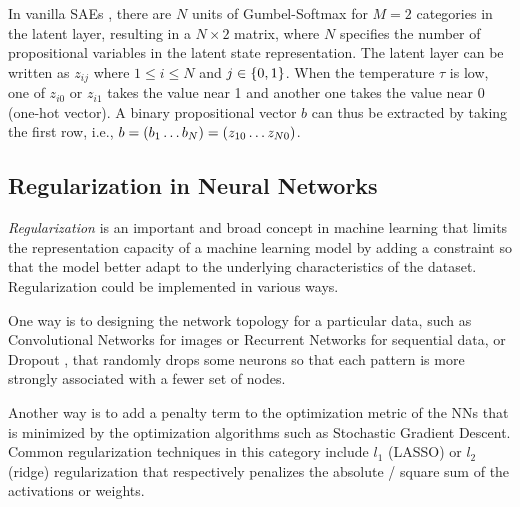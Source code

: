 In vanilla SAEs \cite{Asai2018}, there are $N$ units of Gumbel-Softmax
for $M=2$ categories in the latent layer, resulting in a $N\times 2$ matrix,
where $N$ specifies the number of propositional variables in the latent
state representation. The latent layer can be written as
$z_{ij}$ where $1\leq i \leq N$ and $j\in {\left\{0,1\right\}}$.  When the
temperature $\tau$ is low, one of $z_{i0}$ or $z_{i1}$ takes the value
near 1 and another one takes the value near 0 (one-hot vector).  A binary
propositional vector $b$ can thus be extracted by taking the first row, i.e.,
$b={\left(b_1\ldots b_N\right)}={\left(z_{10}\ldots z_{N0}\right)}$.

\subsection{Regularization in Neural Networks}

\emph{Regularization} is an important and broad concept in machine learning
that limits the representation capacity of a machine learning model by adding a constraint
so that the model better adapt to the underlying characteristics of the dataset.
Regularization could be implemented in various ways.

One way is to designing the network topology for a particular data,
such as Convolutional Networks for images
or Recurrent Networks for sequential data, or
Dropout \cite{srivastava2014dropout}, that randomly drops some neurons so
that each pattern is more strongly associated with a fewer set of nodes.

Another way is to add a penalty term to the optimization metric of the
NNs that is minimized by the optimization algorithms such as Stochastic Gradient Descent.
Common regularization techniques in this category include
$l_1$ (LASSO) or $l_2$ (ridge) regularization that respectively penalizes the absolute / square sum of the
activations or weights.



